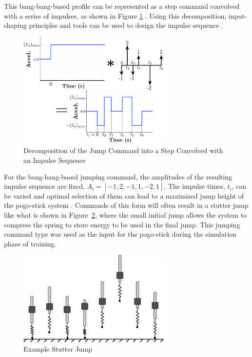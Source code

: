 \documentclass[letterpaper, 10 pt, conference]{ieeeconf}  %
\begin{document}
This bang-bang-based profile can be represented as a step command convolved with a series of impulses, as shown in Figure \ref{fig:jump_convolve} \cite{Sorensen2008CommandinducedVA}. Using this decomposition, input-shaping principles and tools can be used to design the impulse sequence \cite{Singer:90, Singhose:94a}. 
%
\begin{figure}[tbp]
\begin{center}
\includegraphics[width = 3.0in]{figures/jump_convolve}
\caption{Decomposition of the Jump Command into a Step Convolved with an Impulse Sequence}
\label{fig:jump_convolve}
\end{center}
\end{figure}
%
For the bang-bang-based jumping command, the amplitudes of the resulting impulse sequence are fixed, $A_i = [-1, 2, -1, 1, -2, 1]$. The impulse times, $t_i$, can be varied and optimal selection of them can lead to a maximized jump height of the pogo-stick system \cite{Vaughan2013}. Commands of this form will often result in a stutter jump like what is shown in Figure~\ref{fig:stutterJumpFigure}, where the small initial jump allows the system to compress the spring to store energy to be used in the final jump. This jumping command type was used as the input for the pogo-stick during the simulation phase of training.
%
\begin{figure}[t]
        \begin{center}
        \includegraphics[width=3in]{figures/stutter_jump.pdf}
        \caption{Example Stutter Jump}
        \label{fig:stutterJumpFigure} 
        \end{center}
\end{figure}
\end{document}
